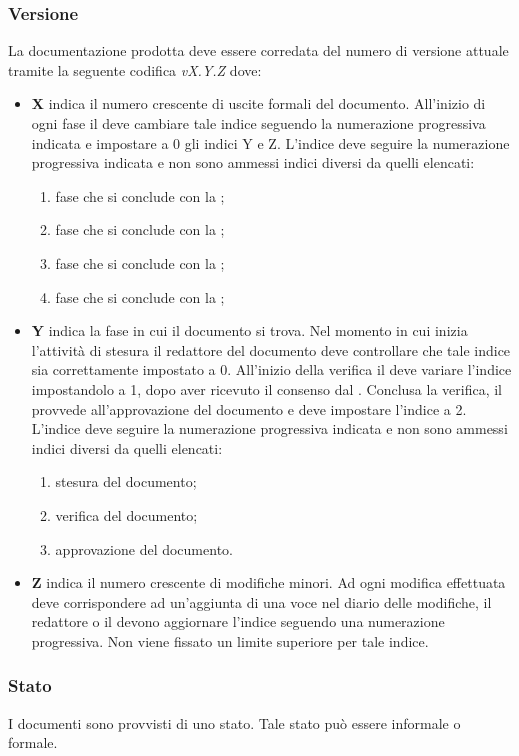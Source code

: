\documentclass[12pt,a4paper]{article}
\begin{document}
\subsubsection{Versione} \label{Versione}
La documentazione prodotta deve essere corredata del numero di versione attuale tramite la seguente codifica \emph{vX.Y.Z} dove:
\begin{itemize}
  \item \textbf{X} indica il numero crescente di uscite formali del documento. All'inizio di ogni fase il \PM deve cambiare tale indice seguendo la numerazione progressiva indicata e impostare a 0 gli indici Y e Z. L'indice deve seguire la numerazione progressiva indicata e non sono ammessi indici diversi da quelli elencati:
  \begin{enumerate}
    \item fase che si conclude con la \RR;
    \item fase che si conclude con la \RP;
    \item fase che si conclude con la \RQ;
    \item fase che si conclude con la \RA;
  \end{enumerate}
  \item \textbf{Y} indica la fase in cui il documento si trova. Nel momento in cui inizia l'attività di stesura il redattore del documento deve controllare che tale indice sia correttamente impostato a 0. All'inizio della verifica il \VR{} deve variare l'indice impostandolo a 1, dopo aver ricevuto il consenso dal \PM. Conclusa la verifica, il \PM{} provvede all'approvazione del documento e deve impostare l'indice a 2. L'indice deve seguire la numerazione progressiva indicata e non sono ammessi indici diversi da quelli elencati:
  \begin{enumerate}[start=0]
    \item stesura del documento;
    \item verifica del documento;
    \item approvazione del documento.
  \end{enumerate}
  \item \textbf{Z} indica il numero crescente di modifiche minori. Ad ogni modifica effettuata deve corrispondere ad un'aggiunta di una voce nel diario delle modifiche, il redattore o il \VR devono aggiornare l'indice seguendo una numerazione progressiva. Non viene fissato un limite superiore per tale indice.
\end{itemize}

\subsubsection{Stato}
I documenti sono provvisti di uno stato. Tale stato può essere informale o formale.
\end{document}
